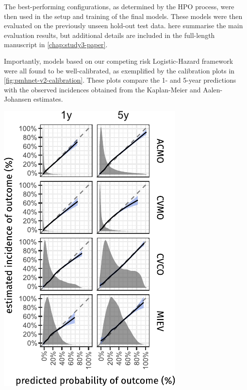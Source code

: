 The best-performing configurations, 
as determined by the \ac{HPO} process,
were then used in the setup and training of 
the final  models.
These models were then evaluated on 
the previously unseen hold-out test data.
here summarise the main evaluation results,
but additional details are included in
the full-length manuscript in \cref{chap:study3-paper}.

Importantly, models based on our competing risk Logistic-Hazard framework  
were all found to be well-calibrated,
as exemplified by the calibration plots 
in \cref{fig:pmhnet-v2-calibration}.
These plots compare the 1- and 5-year predictions 
with the observed incidences obtained from the Kaplan-Meier
and Aalen-Johansen estimates.

\begin{marginfigure}%
    \includegraphics{graphics/pmhnet-v2-visual-calibration.pdf}
    \caption[Calibration of  models at 1 and 5 years]{%
        Calibration plots comparing 
        the cause-specific \(t\)-year  model predictions 
        with the estimated incidences at a 1 and 5 year prediction horizon.
        The included  regression line is obtained by fitting a natural
        cubic spline (\(d.o.f. = 6\)) with pseudo-values obtained
        by jackknife resampling of the Kaplan-Meier 
        ()
        or the Aalen-Johansen 
        (, , and )
        estimates.
        The dashed 45-degree reference lines represent perfect calibration. 
        The density curve in the background of each panel shows the 
        distribution of the model estimates.
    }
    \label{fig:pmhnet-v2-calibration}
\end{marginfigure}%

